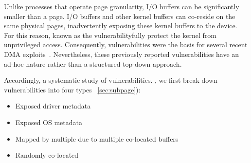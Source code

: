 Unlike processes that operate \DIFdelbegin {}\DIFdelend \DIFaddbegin {}\DIFaddend page granularity, \DIFdelbegin {}\DIFdelend I/O buffers can be significantly smaller than a page. I/O buffers and other kernel buffers can co-reside on the same physical pages, inadvertently exposing these kernel buffers to the device. For this reason, known as the \subpage{} vulnerability\DIFdelbegin {}\DIFdelend \DIFaddbegin {}\DIFaddend fully protect the kernel from unprivileged access. Consequently, \subpage{} vulnerabilities were the basis for several recent DMA exploits~\cite{kupfer2018iommu,thunder,Ben17a,Ben17b}.
Nevertheless, these previously reported vulnerabilities have an ad-hoc nature rather than a structured top-down approach. 


Accordingly, \DIFdelbegin {}\DIFdelend \DIFaddbegin {}\DIFaddend a systematic study of \subpage{} vulnerabilities. \DIFdelbegin {}\DIFdelend \DIFaddbegin {}\DIFaddend , we first break down \subpage{} vulnerabilities into four types \DIFdelbegin {}\DIFdelend \DIFaddbegin {}\DIFaddend ~\ref{sec:subpage}):
\begin{itemize}
    \item Exposed driver metadata
    \DIFdelbegin {}\DIFdelend \item Exposed OS metadata 
    \DIFdelbegin {}\DIFdelend \item Mapped by multiple \iova due to multiple co-located buffers
    \DIFdelbegin {}\DIFdelend %
    \item Randomly co-located
\DIFdelbegin {}\DIFdelend \end{itemize}

